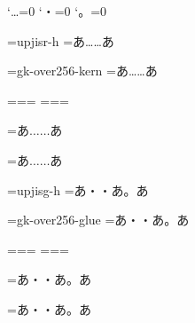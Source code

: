 

\prebreakpenalty`…=0
\prebreakpenalty`・=0
\prebreakpenalty`。=0


\font\x=upjisr-h\x
{}=\hbox{あ……あ}

\font\y=gk-over256-kern\y
{}=\hbox{あ……あ}

\newfam\mx
\newfam\my
\textfont\mx=\x \scriptfont\mx=\x \scriptscriptfont\mx=\x
\textfont\my=\y \scriptfont\my=\y \scriptscriptfont\my=\y

\jfam\mx
{}=\hbox{$あ……あ$}

\jfam\my
{}=\hbox{$あ……あ$}


\font\z=upjisg-h\z
{}=\hbox{あ・・あ。あ}

\font\w=gk-over256-glue\w
{}=\hbox{あ・・あ。あ}

\newfam\mz
\newfam\mw
\textfont\mz=\z \scriptfont\mz=\z \scriptscriptfont\mz=\z
\textfont\mw=\w \scriptfont\mw=\w \scriptscriptfont\mw=\w

\jfam\mz
{}=\hbox{$あ・・あ。あ$}

\jfam\mw
{}=\hbox{$あ・・あ。あ$}

\bye
